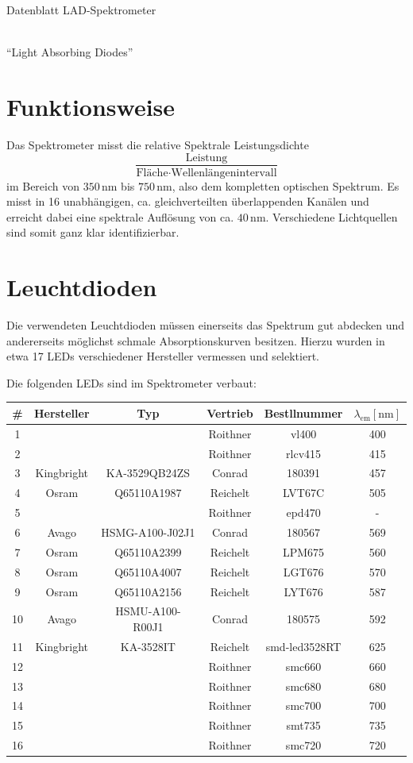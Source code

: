 \documentclass[a4paper, 12pt]{scrartcl}
\newcommand{\unit}[1]{\ensuremath{\,\mathrm{#1}}}
\begin{document}
\begin{center}
\begin{Huge}
Datenblatt LAD-Spektrometer
\end{Huge}
\\[\baselineskip]
"`Light Absorbing Diodes"'
\end{center}


\section{Funktionsweise}
Das Spektrometer misst die relative Spektrale Leistungsdichte
\[
\frac
{\text{Leistung}}
{\text{Fläche}\cdot\text{Wellenlängenintervall}}
\]
im Bereich von $350\unit{nm}$ bis $750\unit{nm}$, also dem kompletten optischen Spektrum.
Es misst in 16 unabhängigen, ca. gleichverteilten überlappenden Kanälen und erreicht dabei eine spektrale Auflösung von ca. $40\unit{nm}$.
Verschiedene Lichtquellen sind somit ganz klar identifizierbar.



\section{Leuchtdioden}
Die verwendeten Leuchtdioden müssen einerseits das Spektrum gut abdecken und andererseits möglichst schmale Absorptionskurven besitzen.
Hierzu wurden in etwa 17 LEDs verschiedener Hersteller vermessen und selektiert.

Die folgenden LEDs sind im Spektrometer verbaut:

{\centering
\begin{tabular}{c|c|c|c|c|c}
\# & Hersteller & Typ & Vertrieb & Bestllnummer & $\lambda_\text{em} [\mathrm{nm}]$ \\
\hline
1 & & & Roithner & vl400 & 400\\
2 & & & Roithner & rlcv415 & 415\\
3 & Kingbright & KA-3529QB24ZS & Conrad & 180391 & 457\\
4 & Osram & Q65110A1987 & Reichelt & LVT67C & 505\\
5 & & & Roithner & epd470 & -\\
6 & Avago & HSMG-A100-J02J1 & Conrad & 180567 & 569\\
7 & Osram & Q65110A2399 & Reichelt & LPM675 & 560\\
8 & Osram & Q65110A4007 & Reichelt & LGT676 & 570\\
9 & Osram & Q65110A2156 & Reichelt & LYT676 & 587\\
10 & Avago & HSMU-A100-R00J1 & Conrad & 180575 & 592\\
11 & Kingbright & KA-3528IT & Reichelt & smd-led3528RT & 625\\
12 & & & Roithner & smc660 & 660\\
13 & & & Roithner & smc680 & 680\\
14 & & & Roithner & smc700 & 700\\
15 & & & Roithner & smt735 & 735\\
16 & & & Roithner & smc720 & 720\\
\end{tabular}}
\end{document}
